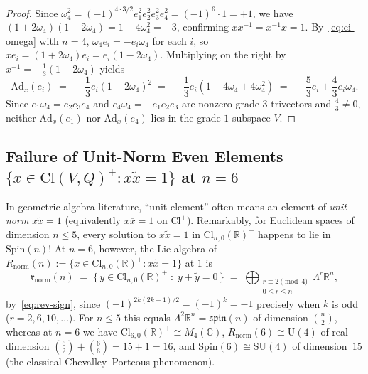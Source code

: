 \documentclass[11pt]{article}
\theoremstyle{definition}
\theoremstyle{remark}
\newcommand{\Cl}{\mathrm{Cl}}
\newcommand{\Spin}{\mathrm{Spin}}
\newcommand{\Ad}{\mathrm{Ad}}
\begin{document}
\begin{proof}
Since $\omega_4^2 = (-1)^{4 \cdot 3 / 2} e_1^2 e_2^2 e_3^2 e_4^2 = (-1)^6 \cdot 1 = +1$, we have $(1 + 2\omega_4)(1 - 2\omega_4) = 1 - 4\omega_4^2 = -3$, confirming $x x^{-1} = x^{-1} x = 1$. By~\eqref{eq:ei-omega} with $n = 4$, $\omega_4 e_i = -e_i \omega_4$ for each $i$, so $x e_i = (1 + 2\omega_4) e_i = e_i (1 - 2\omega_4)$. Multiplying on the right by $x^{-1} = -\frac{1}{3}(1 - 2\omega_4)$ yields
\[
\Ad_x(e_i) \;=\; -\frac{1}{3} e_i (1 - 2\omega_4)^2 \;=\; -\frac{1}{3} e_i (1 - 4\omega_4 + 4\omega_4^2) \;=\; -\frac{5}{3} e_i + \frac{4}{3} e_i \omega_4.
\]
Since $e_1 \omega_4 = e_2 e_3 e_4$ and $e_4 \omega_4 = -e_1 e_2 e_3$ are nonzero grade-$3$ trivectors and $\frac{4}{3} \ne 0$, neither $\Ad_x(e_1)$ nor $\Ad_x(e_4)$ lies in the grade-$1$ subspace $V$.
\end{proof}

\subsection{Failure of Unit-Norm Even Elements \texorpdfstring{$\{x \in \Cl(V,Q)^+ : x \widetilde{x} = 1\}$}{\{x in Cl+ : x rev(x) = 1\}} at \texorpdfstring{$n = 6$}{n = 6}}

In geometric algebra literature, ``unit element'' often means an element of \emph{unit norm} $x \widetilde{x} = 1$ (equivalently $x \overline{x} = 1$ on $\Cl^+$). Remarkably, for Euclidean spaces of dimension $n \le 5$, every solution to $x \widetilde{x} = 1$ in $\Cl_{n,0}(\mathbb{R})^+$ happens to lie in $\Spin(n)$! At $n = 6$, however, the Lie algebra of $R_{\mathrm{norm}}(n) := \{x \in \Cl_{n,0}(\mathbb{R})^+ : x \widetilde{x} = 1\}$ at $1$ is
\[
\mathfrak{r}_{\mathrm{norm}}(n) \;=\; \bigl\{\, y \in \Cl_{n,0}(\mathbb{R})^+ \;:\; y + \widetilde{y} = 0 \,\bigr\}
\;=\; \bigoplus_{\substack{r \equiv 2 \pmod{4} \\ 0 \le r \le n}} \Lambda^r \mathbb{R}^n,
\]
by~\eqref{eq:rev-sign}, since $(-1)^{2k(2k-1)/2} = (-1)^k = -1$ precisely when $k$ is odd ($r = 2, 6, 10, \dots$). For $n \le 5$ this equals $\Lambda^2 \mathbb{R}^n = \mathfrak{spin}(n)$ of dimension $\binom{n}{2}$, whereas at $n = 6$ we have $\Cl_{6,0}(\mathbb{R})^+ \cong M_4(\mathbb{C})$, $R_{\mathrm{norm}}(6) \cong \mathrm{U}(4)$ of real dimension $\binom{6}{2} + \binom{6}{6} = 15 + 1 = 16$, and $\Spin(6) \cong \mathrm{SU}(4)$ of dimension~$15$ (the classical Chevalley--Porteous phenomenon).
\end{document}
